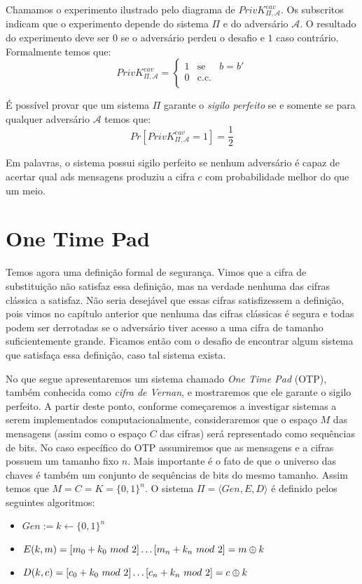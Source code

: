 Chamamos o experimento ilustrado pelo diagrama de $PrivK^{eav}_{\Pi, \mathcal{A}}$.
Os subscritos indicam que o experimento depende do sistema $\Pi$ e do adversário $\mathcal{A}$.
O resultado do experimento deve ser $0$ se o adversário perdeu o desafio e $1$ caso contrário.
Formalmente temos que:
\begin{displaymath}
  PrivK^{eav}_{\Pi, \mathcal{A}} = \left\{
    \begin{array}{lcl}
      1 & \textrm{se} & b = b'\\
      0 & \textrm{c.c.} &\\
    \end{array}
    \right.
\end{displaymath}

É possível provar que um sistema $\Pi$ garante o {\em sigilo perfeito} se e somente se para qualquer adversário $\mathcal{A}$ temos que:
\begin{displaymath}
Pr[PrivK^{eav}_{\Pi, \mathcal{A}} = 1] = \frac{1}{2}
\end{displaymath}

Em palavras, o sistema possui sigilo perfeito se nenhum adversário é capaz de acertar qual ads mensagens produziu a cifra $c$ com probabilidade melhor do que um meio.

\section{One Time Pad}
\label{sec:otp}

Temos agora uma definição formal de segurança.
Vimos que a cifra de substituição não satisfaz essa definição, mas na verdade nenhuma das cifras clássica a satisfaz.
Não seria desejável que essas cifras satisfizessem a definição, pois vimos no capítulo anterior que nenhuma das cifras clássicas é segura e todas podem ser derrotadas se o adversário tiver acesso a uma cifra de tamanho suficientemente grande.
Ficamos então com o desafio de encontrar algum sistema que satisfaça essa definição, caso tal sistema exista.

No que segue apresentaremos um sistema chamado {\em One Time Pad} (OTP), também conhecida como {\em cifra de Vernan}, e mostraremos que ele garante o sigilo perfeito.
A partir deste ponto, conforme começaremos a investigar sistemas a serem implementados computacionalmente, consideraremos que o espaço $M$ das mensagens (assim como o espaço $C$ das cifras) será representado como sequências de bits.
No caso específico do OTP assumiremos que as mensagens e a cifras possuem um tamanho fixo $n$.
Mais importante é o fato de que o universo das chaves é também um conjunto de sequências de bits do mesmo tamanho.
Assim temos que $M = C = K = \{0,1\}^n$.
O sistema $\Pi = \langle Gen, E, D \rangle$ é definido pelos seguintes algoritmos:
\begin{itemize}
\item $Gen := k \leftarrow \{0,1\}^n$
\item $E(k,m) = [m_0 + k_0\ mod\ 2] \dots [m_n + k_n\ mod\ 2] = m \oplus k$
\item $D(k,c) = [c_0 + k_0\ mod\ 2] \dots [c_n + k_n\ mod\ 2] = c \oplus k$
\end{itemize}

